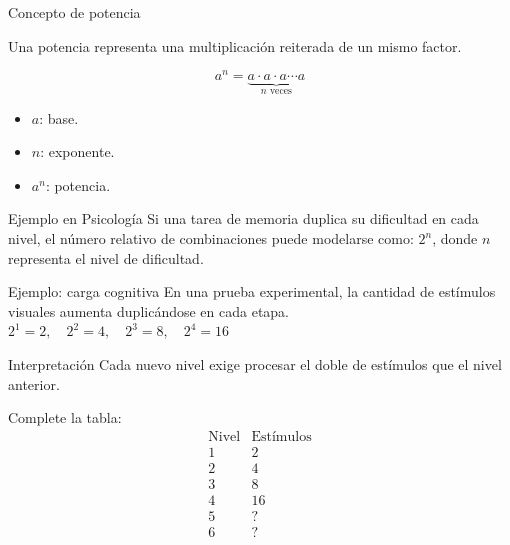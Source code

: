 \documentclass[aspectratio=169]{beamer}
\begin{document}
	\begin{frame}{Concepto de potencia}
		\begin{idea}
			Una potencia representa una multiplicación reiterada de un mismo factor.
		\end{idea}
		
		\[
		a^n=
		\underbrace{a\cdot a\cdot a\cdots a}_{n\text{ veces}}
		\]
		
		\pause
		
			\begin{itemize}
				\item \(a\): base.
				\item \(n\): exponente.
				\item \(a^n\): potencia.
			\end{itemize}
	
		\pause
		
		\begin{exampleblock}{Ejemplo en Psicología}
			Si una tarea de memoria duplica su dificultad en cada nivel, el número relativo de combinaciones puede modelarse como: $2^n$, donde \(n\) representa el nivel de dificultad.
		\end{exampleblock}
	\end{frame}
	
	
	\begin{frame}{Ejemplo: carga cognitiva}
		En una prueba experimental, la cantidad de estímulos visuales aumenta duplicándose en cada etapa. $2^1=2,\quad 2^2=4,\quad 2^3=8,\quad 2^4=16$
		
		\pause
		
		\begin{block}{Interpretación}
			Cada nuevo nivel exige procesar el doble de estímulos que el nivel anterior.
		\end{block}
		
		\pause
		
		\begin{actividad}
			Complete la tabla:
			\[\begin{array}{c|c}
				\text{Nivel} & \text{Estímulos} \\
				\hline
				1 & 2 \\
				2 & 4 \\
				3 & 8 \\
				4 & 16 \\
				5 & ? \\
				6 & ?
			\end{array}
			\]
		\end{actividad}
	\end{frame}
	
\end{document}
